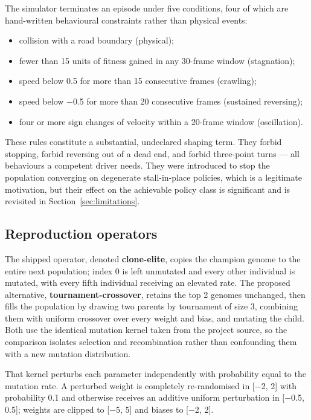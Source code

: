\documentclass[conference]{IEEEtran}
\begin{document}
The simulator terminates an episode under five conditions, four of which are hand-written behavioural constraints rather than physical events:

\begin{itemize}
\item collision with a road boundary (physical);
\item fewer than 15 units of fitness gained in any 30-frame window (stagnation);
\item speed below 0.5 for more than 15 consecutive frames (crawling);
\item speed below −0.5 for more than 20 consecutive frames (sustained reversing);
\item four or more sign changes of velocity within a 20-frame window (oscillation).
\end{itemize}

These rules constitute a substantial, undeclared shaping term. They forbid stopping, forbid reversing out of a dead end, and forbid three-point turns — all behaviours a competent driver needs. They were introduced to stop the population converging on degenerate stall-in-place policies, which is a legitimate motivation, but their effect on the achievable policy class is significant and is revisited in Section~\ref{sec:limitations}.

\subsection{Reproduction operators}

The shipped operator, denoted \textbf{clone-elite}, copies the champion genome to the entire next population; index 0 is left unmutated and every other individual is mutated, with every fifth individual receiving an elevated rate. The proposed alternative, \textbf{tournament-crossover}, retains the top 2 genomes unchanged, then fills the population by drawing two parents by tournament of size 3, combining them with uniform crossover over every weight and bias, and mutating the child. Both use the identical mutation kernel taken from the project source, so the comparison isolates selection and recombination rather than confounding them with a new mutation distribution.

That kernel perturbs each parameter independently with probability equal to the mutation rate. A perturbed weight is completely re-randomised in [−2, 2] with probability 0.1 and otherwise receives an additive uniform perturbation in [−0.5, 0.5]; weights are clipped to [−5, 5] and biases to [−2, 2].
\end{document}
